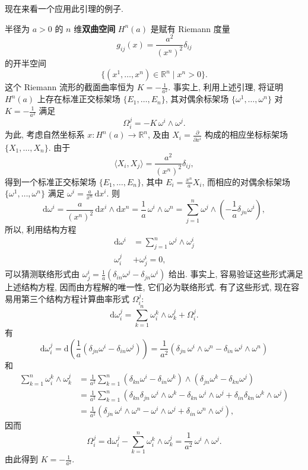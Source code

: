 现在来看一个应用此引理的例子.

\begin{RiemannExample}\label{ex:constant-curvature-of-hyperbolic-space}
半径为 $a>0$ 的 $n$ 维\textbf{双曲空间} $H^n(a)$ 是赋有 Riemann 度量
\[
  g_{ij}(x)=\frac{a^2}{(x^n)^2}\delta_{ij}
\]
的开半空间
\[
  \{(x^1,\ldots,x^n)\in\mathbb{R}^n\mid x^n>0\}.
\]
这个 Riemann 流形的截面曲率恒为 $K=-\frac1{a^2}$. 事实上, 利用上述引理, 将证明 $H^n(a)$ 上存在标准正交标架场 $\{E_1,\ldots,E_n\}$, 其对偶余标架场 $\{\omega^1,\ldots,\omega^n\}$ 对 $K=-\frac1{a^2}$ 满足
\begin{equation}\label{eq:target-curvature-forms-of-hyperbolic-space}
  \Omega_i^j=-K\,\omega^i\wedge\omega^j.
\end{equation}
为此, 考虑自然坐标系 $x:H^n(a)\to\mathbb{R}^n$, 及由 $X_i=\frac{\partial}{\partial x^i}$ 构成的相应坐标标架场 $\{X_1,\ldots,X_n\}$. 由于
\[
  \langle X_i,X_j\rangle=\frac{a^2}{(x^n)^2}\delta_{ij},
\]
得到一个标准正交标架场 $\{E_1,\ldots,E_n\}$, 其中 $E_i=\frac{x^n}{a}X_i$, 而相应的对偶余标架场 $\{\omega^1,\ldots,\omega^n\}$ 满足 $\omega^i=\frac{a}{x^n}\,\mathrm{d}x^i$. 则
\[
  \mathrm{d}\omega^i=\frac{a}{(x^n)^2}\,\mathrm{d}x^i\wedge\mathrm{d}x^n
  =\frac1a\,\omega^i\wedge\omega^n
  =\sum_{j=1}^n\omega^j\wedge\left(-\frac1a\delta_{jn}\omega^i\right),
\]
所以, 利用结构方程
\begin{align*}
  \mathrm{d}\omega^i&=\sum_{j=1}^n\omega^j\wedge\omega_j^i\\
  \omega_i^j&+\omega_j^i=0,
\end{align*}
可以猜测联络形式由 $\omega_j^i=\frac1a(\delta_{in}\omega^j-\delta_{jn}\omega^i)$ 给出. 事实上, 容易验证这些形式满足上述结构方程, 因而由方程解的唯一性, 它们必为联络形式. 有了这些形式, 现在容易用第三个结构方程计算曲率形式 $\Omega_i^j$:
\[
  \mathrm{d}\omega_i^j=\sum_{k=1}^n\omega_i^k\wedge\omega_k^j+\Omega_i^j.
\]
有
\[
  \mathrm{d}\omega_i^j=\mathrm{d}\left(\frac1a(\delta_{jn}\omega^i-\delta_{in}\omega^j)\right)
  =\frac1{a^2}(\delta_{jn}\,\omega^i\wedge\omega^n-\delta_{in}\,\omega^j\wedge\omega^n)
\]
和
\begin{align*}
  \sum_{k=1}^n\omega_i^k\wedge\omega_k^j
  &=\frac1{a^2}\sum_{k=1}^n(\delta_{kn}\omega^i-\delta_{in}\omega^k)
    \wedge(\delta_{jn}\omega^k-\delta_{kn}\omega^j)\\
  &=\frac1{a^2}\sum_{k=1}^n(\delta_{kn}\delta_{jn}\,\omega^i\wedge\omega^k
    -\delta_{kn}\,\omega^i\wedge\omega^j+\delta_{in}\delta_{kn}\,\omega^k\wedge\omega^j)\\
  &=\frac1{a^2}(\delta_{jn}\,\omega^i\wedge\omega^n-\omega^i\wedge\omega^j
    +\delta_{in}\,\omega^n\wedge\omega^j),
\end{align*}
因而
\[
  \Omega_i^j=\mathrm{d}\omega_i^j-\sum_{k=1}^n\omega_i^k\wedge\omega_k^j
  =\frac1{a^2}\,\omega^i\wedge\omega^j.
\]
由此得到 $K=-\frac1{a^2}$.
\end{RiemannExample}

